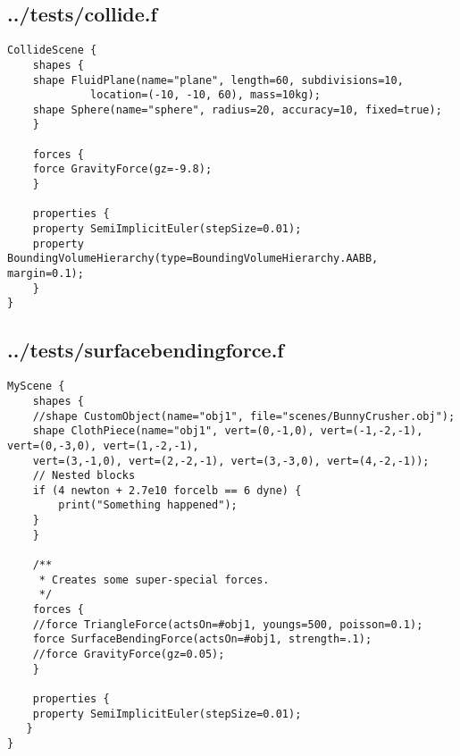 \subsection*{../tests/collide.f}
\begin{lstlisting}
CollideScene {
    shapes {
	shape FluidPlane(name="plane", length=60, subdivisions=10,
			 location=(-10, -10, 60), mass=10kg);
	shape Sphere(name="sphere", radius=20, accuracy=10, fixed=true);
    }

    forces {
	force GravityForce(gz=-9.8);
    }

    properties {
	property SemiImplicitEuler(stepSize=0.01);
	property BoundingVolumeHierarchy(type=BoundingVolumeHierarchy.AABB, margin=0.1);
    }
}
\end{lstlisting}

\subsection*{../tests/surfacebendingforce.f}
\begin{lstlisting}
MyScene {
    shapes {
	//shape CustomObject(name="obj1", file="scenes/BunnyCrusher.obj");
	shape ClothPiece(name="obj1", vert=(0,-1,0), vert=(-1,-2,-1), vert=(0,-3,0), vert=(1,-2,-1), 
	vert=(3,-1,0), vert=(2,-2,-1), vert=(3,-3,0), vert=(4,-2,-1));
	// Nested blocks
	if (4 newton + 2.7e10 forcelb == 6 dyne) {
	    print("Something happened");
	}
    }

    /**
     * Creates some super-special forces.
     */
    forces {
	//force TriangleForce(actsOn=#obj1, youngs=500, poisson=0.1);
	force SurfaceBendingForce(actsOn=#obj1, strength=.1);
	//force GravityForce(gz=0.05);
    }

    properties { 
	property SemiImplicitEuler(stepSize=0.01);
   }
}
\end{lstlisting}

